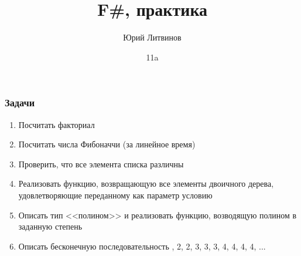 \documentclass[xetex,mathserif,serif]{beamer}
\title{F\#, практика}
\author{Юрий Литвинов}
\date{11a}
\begin{document}
	\frame{\titlepage}

	\begin{frame}
		\frametitle{Задачи}
		\begin{enumerate}
			\item Посчитать факториал
			\item Посчитать числа Фибоначчи (за линейное время)
			\item Проверить, что все элемента списка различны
			\item Реализовать функцию, возвращающую все элементы двоичного дерева, удовлетворяющие переданному как параметр условию
			\item Описать тип <<полином>> и реализовать функцию, возводящую полином в заданную степень
			\item Описать бесконечную последовательность , 2, 2, 3, 3, 3, 4, 4, 4, 4, ...
		\end{enumerate}
	\end{frame}
\end{document}
